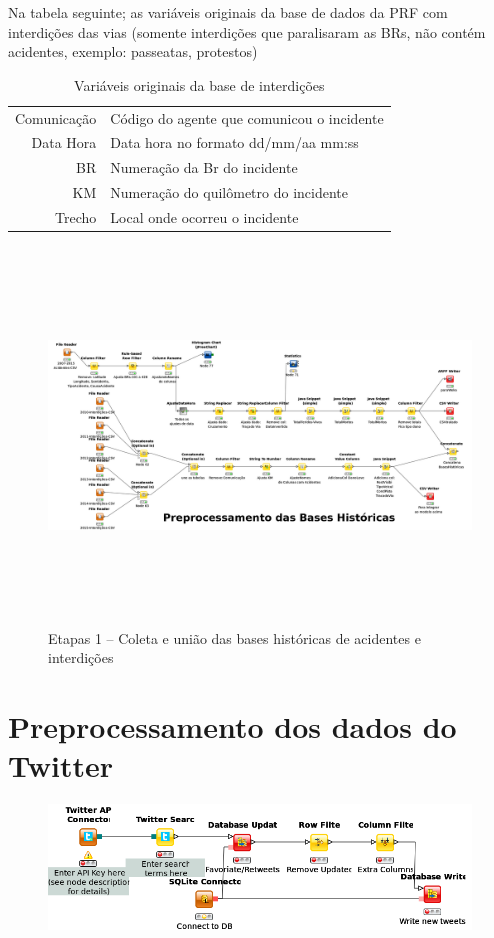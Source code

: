 \pagebreak

Na tabela seguinte; as variáveis originais da base de dados da PRF com interdições das vias 
(somente interdições que paralisaram as BRs, não contém acidentes, exemplo: passeatas, protestos) 

\begin{table}[htbp]
 \centering
  \caption{Variáveis originais da base de interdições}
  
  \begin{tabular}{r|l} \hline
   Comunicação & Código do agente que comunicou o incidente \\
   Data Hora & Data hora no formato dd/mm/aa mm:ss \\
   BR & Numeração da Br do incidente\\
   KM & Numeração do quilômetro do incidente\\
   Trecho  & Local onde ocorreu o incidente \\
  \end{tabular}
\end{table}


\begin{figure}[ht]
  \centering
    \caption{Etapas 1 -- Coleta e união das bases históricas de acidentes e interdições}
    \includegraphics[width=165mm, height=100mm]{Figuras/Cronograma/BasesHistoricas.png}
\end{figure}

\pagebreak

\section{Preprocessamento dos dados do Twitter}

\begin{figure}
\centering
\includegraphics[width=0.7\linewidth]{Figuras/Twitter/workflow}
\caption{}
\label{fig:workflow}
\end{figure}


